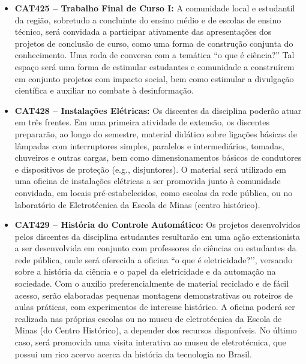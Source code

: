 \documentclass[
	12pt,				%
	openright,			%
	oneside,			%
	a4paper,			%
	english,			%
	brazil				%
	]{abntex2}
\begin{document}
\begin{itemize}
     \item \textbf{CAT425 -- Trabalho Final de Curso I:} A comunidade local e estudantil da região, sobretudo a concluinte do ensino médio e de escolas de ensino técnico, será convidada a participar ativamente das apresentações dos projetos de conclusão de curso, como uma forma de construção conjunta do conhecimento. Uma roda de conversa com a temática ``o que é ciência?'' Tal espaço será uma forma de estimular estudantes e comunidade a construírem em conjunto projetos com impacto social, bem como estimular a divulgação científica e auxiliar no combate à desinformação.

     \item \textbf{CAT428 -- Instalações Elétricas:} Os discentes da disciplina poderão atuar em três frentes. Em uma primeira atividade de extensão, os discentes prepararão, ao longo do semestre, material didático sobre ligações básicas de lâmpadas com interruptores simples, paralelos e intermediários, tomadas, chuveiros e outras cargas, bem como dimensionamentos básicos de condutores e dispositivos de proteção (e.g., disjuntores). O material será utilizado em uma oficina de instalações elétricas a ser promovida junto à comunidade convidada, em locais pré-estabelecidos, como escolas da rede pública, ou no laboratório de Eletrotécnica da Escola de Minas (centro histórico). 

    \item \textbf{CAT429 -- História do Controle Automático:} Os projetos desenvolvidos pelos discentes da disciplina estudantes resultarão em uma ação extensionista a ser desenvolvida em conjunto com professores de ciências ou estudantes da rede pública, onde será oferecida a oficina ``o que é eletricidade?’’, versando sobre a história da ciência e o papel da eletricidade e da automação na sociedade. Com o auxílio preferencialmente de material reciclado e de fácil acesso, serão elaboradas pequenas montagens demonstrativas ou roteiros de aulas práticas, com experimentos de interesse histórico. A oficina poderá ser realizada nas próprias escolas ou no museu de eletrotécnica da Escola de Minas (do Centro Histórico), a depender dos recursos disponíveis. No último caso, será promovida uma visita interativa ao museu de eletrotécnica, que possui um rico acervo acerca da história da tecnologia no Brasil.
%
\end{itemize}
\end{document}
